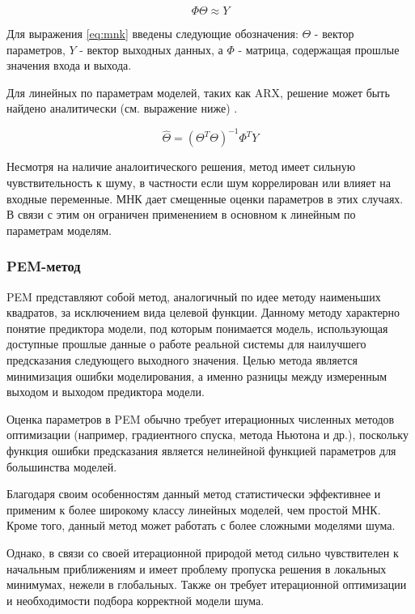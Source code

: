 \begin{equation}
  \Phi\Theta \approx Y
  \label{eq:mnk}
\end{equation}

Для выражения \ref{eq:mnk} введены следующие обозначения: $\Theta$ - вектор
параметров, $Y$ - вектор выходных данных, а $\Phi$ - матрица, содержащая
прошлые значения входа и выхода.

Для линейных по параметрам моделей, таких как ARX, решение может быть найдено
аналитически (см. выражение ниже) \cite{bib:arx}.

\begin{equation}
  \hat{\Theta} = (\Theta^T \Theta)^{-1} \Phi^T Y
  \label{eq:mnk_arx_sol}
\end{equation}

Несмотря на наличие аналоитического решения,
метод имеет сильную чувствительность к шуму,
в частности если шум коррелирован или влияет
на входные переменные. МНК дает смещенные
оценки параметров в этих случаях. В связи с
этим он ограничен применением в основном к
линейным по параметрам моделям.

\subsubsection{PEM-метод}

PEM представляют собой метод, аналогичный по идее методу наименьших квадратов,
за исключением вида целевой функции. Данному методу характерно понятие
предиктора модели, под которым понимается модель, использующая доступные
прошлые данные о работе реальной системы для наилучшего предсказания следующего
выходного значения. Целью метода является минимизация ошибки моделирования, а
именно разницы между измеренным выходом и выходом предиктора модели. 

Оценка параметров в PEM обычно требует итерационных численных методов
оптимизации (например, градиентного спуска, метода Ньютона и др.), поскольку
функция ошибки предсказания является нелинейной функцией параметров для
большинства моделей. 

Благодаря своим особенностям данный метод статистически эффективнее и применим
к более широкому классу линейных моделей, чем простой МНК. Кроме того, данный
метод может работать с более сложными моделями шума.

Однако, в связи со своей итерационной природой метод сильно чувствителен к
начальным приближениям и имеет проблему пропуска решения в локальных минимумах,
нежели в глобальных. Также он требует итерационной оптимизации и необходимости
подбора корректной модели шума.


